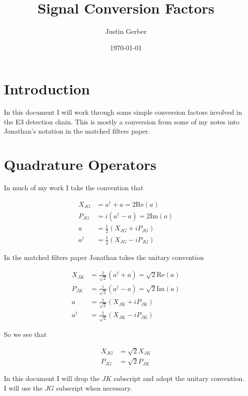 \documentclass[12pt]{article}
\begin{document}
\title{Signal Conversion Factors}
\author{Justin Gerber}
\date{\today}
\maketitle

\section{Introduction}
In this document I will work through some simple conversion factors involved in the E3 detection chain. This is mostly a conversion from some of my notes into Jonathan's notation in the matched filters paper. 

\section{Quadrature Operators}

In much of my work I take the convention that

\begin{align}
X_{JG} &= a^{\dag} + a = 2\text{Re}(a)\\
P_{JG} &= i(a^{\dag} - a) = 2\text{Im}(a)\\
a &= \frac{1}{2}\left(X_{JG} + i P_{JG}\right)\\
a^{\dag} &= \frac{1}{2}\left(X_{JG} - i P_{JG}\right)
\end{align}

In the matched filters paper Jonathan takes the unitary convention

\begin{align}
X_{JK} &= \frac{1}{\sqrt{2}}\left(a^{\dag} + a\right) = \sqrt{2}\text{Re}(a)\\
P_{JK} &= \frac{i}{\sqrt{2}}\left(a^{\dag} - a\right) = \sqrt{2}\text{Im}(a)\\
a &= \frac{1}{\sqrt{2}}\left(X_{JK} + i P_{JK}\right)\\
a^{\dag} &= \frac{1}{\sqrt{2}}\left(X_{JK} - i P_{JK}\right)
\end{align}

So we see that

\begin{align}
X_{JG} &= \sqrt{2} X_{JK}\\
P_{JG} &= \sqrt{2} P_{JK}
\end{align}

In this document I will drop the $JK$ subscript and adopt the unitary convention. I will use the $JG$ subscript when necessary.
\end{document}
